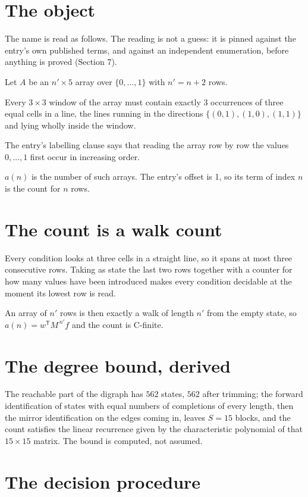 \documentclass[11pt]{article}
\theoremstyle{definition}
\begin{document}
\section{The object}

The name is read as follows. The reading is not a guess: it is pinned against the entry's own published terms, and against an independent enumeration, before anything is proved (Section 7).

Let $A$ be an $n' \times 5$ array over $\{0,\dots,1\}$ with $n' = n + 2$ rows.

Every $3\times3$ window of the array must contain exactly $3$ occurrences of three equal cells in a line, the lines running in the directions $\{(0,1), (1,0), (1,1)\}$ and lying wholly inside the window.

The entry's labelling clause says that reading the array row by row the values $0,\dots,1$ first occur in increasing order.

$a(n)$ is the number of such arrays. The entry's offset is 1, so its term of index $n$ is the count for $n$ rows.

\section{The count is a walk count}

Every condition looks at three cells in a straight line, so it spans at most three consecutive rows. Taking as state the last two rows together with a counter for how many values have been introduced makes every condition decidable at the moment its lowest row is read.

An array of $n'$ rows is then exactly a walk of length $n'$ from the empty state, so $a(n) = w^{\mathsf T}M^{\,n'}f$ and the count is C-finite.

\section{The degree bound, derived}

The reachable part of the digraph has $562$ states, $562$ after trimming; the forward identification of states with equal numbers of completions of every length, then the mirror identification on the edges coming in, leaves $S = 15$ blocks, and the count satisfies the linear recurrence given by the characteristic polynomial of that $15\times15$ matrix. The bound is computed, not assumed.

\section{The decision procedure}
\end{document}
